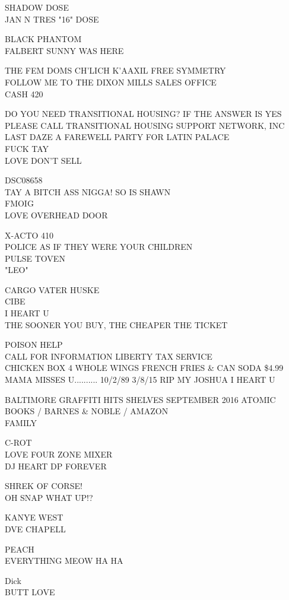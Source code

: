 \documentclass[10pt,letterpaper]{article}
\begin{document}
SHADOW DOSE\\
JAN N TRES "16" DOSE

BLACK PHANTOM\\
FALBERT SUNNY WAS HERE

THE FEM DOMS CH'LICH K'AAXIL FREE SYMMETRY\\
FOLLOW ME TO THE DIXON MILLS SALES OFFICE\\
CASH 420

DO YOU NEED TRANSITIONAL HOUSING?  IF THE ANSWER IS YES PLEASE CALL TRANSITIONAL HOUSING SUPPORT NETWORK, INC\\
LAST DAZE A FAREWELL PARTY FOR LATIN PALACE\\
FUCK TAY\\
LOVE DON'T SELL

DSC08658\\
TAY A BITCH ASS NIGGA!  SO IS SHAWN\\
FMOIG\\
LOVE OVERHEAD DOOR

X{-}ACTO 410\\
POLICE AS IF THEY WERE YOUR CHILDREN\\
PULSE TOVEN\\
"LEO"

CARGO VATER HUSKE\\
CIBE\\
I HEART U\\
THE SOONER YOU BUY, THE CHEAPER THE TICKET

POISON HELP\\
CALL FOR INFORMATION LIBERTY TAX SERVICE\\
CHICKEN BOX 4 WHOLE WINGS FRENCH FRIES \& CAN SODA \$4.99\\
MAMA MISSES U.......... 10/2/89 3/8/15 RIP MY JOSHUA I HEART U

BALTIMORE GRAFFITI HITS SHELVES SEPTEMBER 2016 ATOMIC BOOKS / BARNES \& NOBLE / AMAZON\\
FAMILY

C{-}ROT\\
LOVE FOUR ZONE MIXER\\
DJ HEART DP FOREVER

SHREK OF CORSE!\\
OH SNAP WHAT UP!?

KANYE WEST\\
DVE CHAPELL

PEACH\\
EVERYTHING MEOW HA HA

Dick\\
BUTT LOVE
\end{document}
